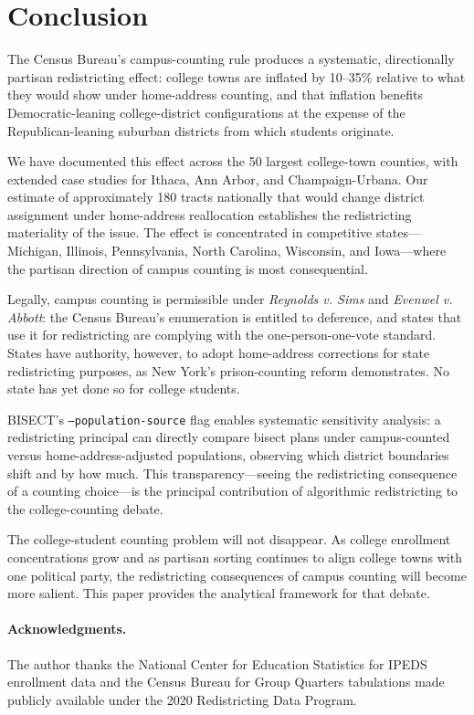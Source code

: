 \section{Conclusion}
\label{sec:conclusion}

The Census Bureau's campus-counting rule produces a systematic, directionally partisan redistricting effect: college towns are inflated by 10--35\% relative to what they would show under home-address counting, and that inflation benefits Democratic-leaning college-district configurations at the expense of the Republican-leaning suburban districts from which students originate.

We have documented this effect across the 50 largest college-town counties, with extended case studies for Ithaca, Ann Arbor, and Champaign-Urbana. Our estimate of approximately 180 tracts nationally that would change district assignment under home-address reallocation establishes the redistricting materiality of the issue. The effect is concentrated in competitive states---Michigan, Illinois, Pennsylvania, North Carolina, Wisconsin, and Iowa---where the partisan direction of campus counting is most consequential.

Legally, campus counting is permissible under \emph{Reynolds v. Sims} and \emph{Evenwel v. Abbott}: the Census Bureau's enumeration is entitled to deference, and states that use it for redistricting are complying with the one-person-one-vote standard. States have authority, however, to adopt home-address corrections for state redistricting purposes, as New York's prison-counting reform demonstrates. No state has yet done so for college students.

BISECT's \texttt{--population-source} flag enables systematic sensitivity analysis: a redistricting principal can directly compare bisect plans under campus-counted versus home-address-adjusted populations, observing which district boundaries shift and by how much. This transparency---seeing the redistricting consequence of a counting choice---is the principal contribution of algorithmic redistricting to the college-counting debate.

The college-student counting problem will not disappear. As college enrollment concentrations grow and as partisan sorting continues to align college towns with one political party, the redistricting consequences of campus counting will become more salient. This paper provides the analytical framework for that debate.

\paragraph{Acknowledgments.}
The author thanks the National Center for Education Statistics for IPEDS enrollment data and the Census Bureau for Group Quarters tabulations made publicly available under the 2020 Redistricting Data Program.
